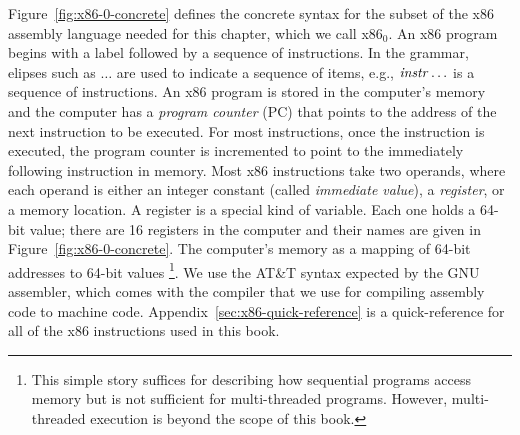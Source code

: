 \documentclass[11pt]{book}
\begin{document}
Figure~\ref{fig:x86-0-concrete} defines the concrete syntax for the subset of
the x86 assembly language needed for this chapter, which we call x86$_0$.
%
An x86 program begins with a  label followed by a sequence
of instructions.  In the grammar, elipses such as $\ldots$ are used to
indicate a sequence of items, e.g., $\mathit{instr} \ldots$ is a sequence of
instructions.
%
An x86 program is stored in the computer's memory and the computer has
a \emph{program counter} (PC)
that points to the address of the next
instruction to be executed. For most instructions, once the
instruction is executed, the program counter is incremented to point
to the immediately following instruction in memory. Most x86
instructions take two operands, where each operand is either an
integer constant (called \emph{immediate value}),
a \emph{register}, or a memory location.
A register is a special kind of variable. Each
one holds a 64-bit value; there are 16 registers in the computer and
their names are given in Figure~\ref{fig:x86-0-concrete}. The computer's memory
as a mapping of 64-bit addresses to 64-bit values%
\footnote{This simple story suffices for describing how sequential
  programs access memory but is not sufficient for multi-threaded
  programs. However, multi-threaded execution is beyond the scope of
  this book.}.
%
We use the AT\&T syntax expected by the GNU assembler, which comes
with the  compiler that we use for compiling assembly code to
machine code.
%
Appendix~\ref{sec:x86-quick-reference} is a quick-reference for all of
the x86 instructions used in this book.



\newcommand{\allregisters}{\key{rsp} \mid \key{rbp} \mid \key{rax} \mid \key{rbx} \mid \key{rcx}
              \mid \key{rdx} \mid \key{rsi} \mid \key{rdi} \mid \\
              && \key{r8} \mid \key{r9} \mid \key{r10}
              \mid \key{r11} \mid \key{r12} \mid \key{r13}
              \mid \key{r14} \mid \key{r15}}
\end{document}
